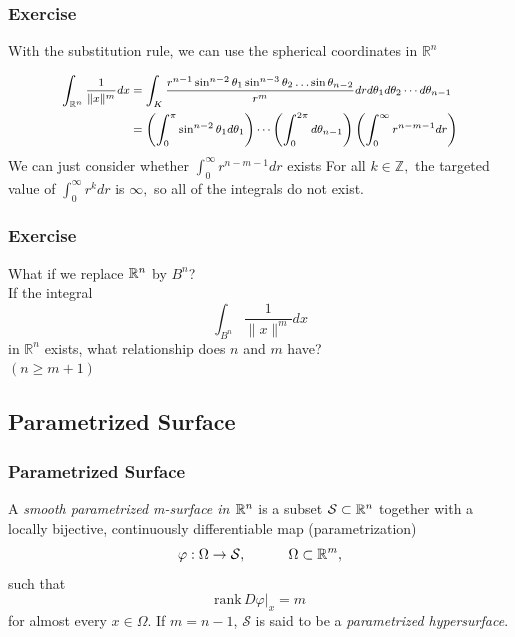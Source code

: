 \documentclass[12pt, t]{beamer}
\renewcommand{\emph}[1]{{\color{Turquoise3}\textsl{#1}}}
\newcommand{\nullspace}{~\\[15pt]}
\begin{document}
\begin{frame}
    \frametitle{Exercise}
    With the substitution rule, we can use the spherical coordinates in $\mathbb{R}^{n}$

    \[
        \footnotesize
        \begin{aligned}
            \int_{\mathbb{R}^{n}} \frac{1}{\|x\|^{m}} d x & =\int_{K} \frac{r^{n-1} \sin ^{n-2} \theta_{1} \sin ^{n-3} \theta_{2} \ldots \sin \theta_{n-2}}{r^{m}} d r d \theta_{1} d \theta_{2} \cdots d \theta_{n-1}       \\
                                                          & =\left(\int_{0}^{\pi} \sin ^{n-2} \theta_{1} d \theta_{1}\right) \cdots\left(\int_{0}^{2\pi}   d \theta_{n-1}\right)\left(\int_{0}^{\infty} r^{n-m-1} d r\right)
        \end{aligned}
    \]
    We can just consider whether $\int_{0}^{\infty} r^{n-m-1} d r$ exists For all $k \in \mathbb{Z},$ the targeted value of $\int_{0}^{\infty} r^{k} d r$ is $\infty,$ so all of the integrals do not exist.
\end{frame}

\begin{frame}
    \frametitle{Exercise}
    What if we replace $\mathbb{R}^n$ by $B^n$?
    \nullspace
    If the integral $$\int_{B^n} \frac{1}{\|x\|^{m}} d x$$ in $\mathbb{R}^{n}$ exists, what relationship does $n$ and $m$ have?
    \nullspace
    \pause $(n \geq m+1)$
\end{frame}

\subsection{Parametrized Surface}
\begin{frame}
    \frametitle{Parametrized Surface}
    A \emph{smooth parametrized m-surface in $\mathbb{R}^n$} is a subset $\mathcal{S}\subset\mathbb{R}^n$ together with a locally bijective, continuously dif{}ferentiable map (parametrization)
    \[\varphi:\Omega\to\mathcal{S},\qquad\quad
        \Omega\subset\mathbb{R}^m,\]
    such that
    \[\text{rank}\,D\varphi|_x=m\]
    for almost every $x\in\Omega$. If $m=n-1$, $\mathcal{S}$ is said to be a \emph{parametrized hypersurface}.
\end{frame}
\end{document}
